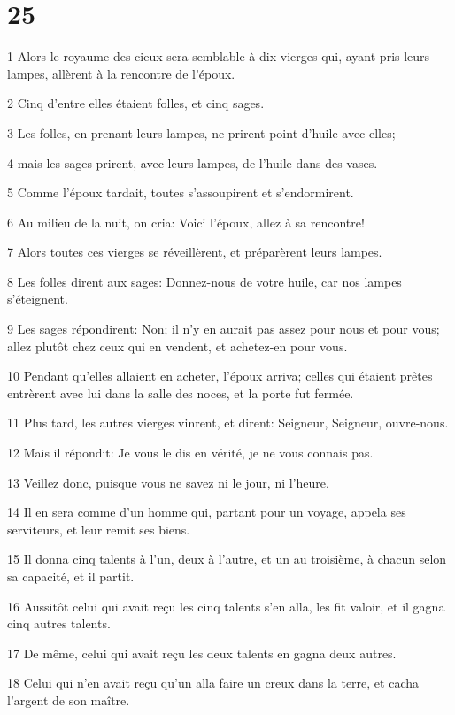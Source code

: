 \chapter{25}

\par 1 Alors le royaume des cieux sera semblable à dix vierges qui, ayant pris leurs lampes, allèrent à la rencontre de l'époux.
\par 2 Cinq d'entre elles étaient folles, et cinq sages.
\par 3 Les folles, en prenant leurs lampes, ne prirent point d'huile avec elles;
\par 4 mais les sages prirent, avec leurs lampes, de l'huile dans des vases.
\par 5 Comme l'époux tardait, toutes s'assoupirent et s'endormirent.
\par 6 Au milieu de la nuit, on cria: Voici l'époux, allez à sa rencontre!
\par 7 Alors toutes ces vierges se réveillèrent, et préparèrent leurs lampes.
\par 8 Les folles dirent aux sages: Donnez-nous de votre huile, car nos lampes s'éteignent.
\par 9 Les sages répondirent: Non; il n'y en aurait pas assez pour nous et pour vous; allez plutôt chez ceux qui en vendent, et achetez-en pour vous.
\par 10 Pendant qu'elles allaient en acheter, l'époux arriva; celles qui étaient prêtes entrèrent avec lui dans la salle des noces, et la porte fut fermée.
\par 11 Plus tard, les autres vierges vinrent, et dirent: Seigneur, Seigneur, ouvre-nous.
\par 12 Mais il répondit: Je vous le dis en vérité, je ne vous connais pas.
\par 13 Veillez donc, puisque vous ne savez ni le jour, ni l'heure.
\par 14 Il en sera comme d'un homme qui, partant pour un voyage, appela ses serviteurs, et leur remit ses biens.
\par 15 Il donna cinq talents à l'un, deux à l'autre, et un au troisième, à chacun selon sa capacité, et il partit.
\par 16 Aussitôt celui qui avait reçu les cinq talents s'en alla, les fit valoir, et il gagna cinq autres talents.
\par 17 De même, celui qui avait reçu les deux talents en gagna deux autres.
\par 18 Celui qui n'en avait reçu qu'un alla faire un creux dans la terre, et cacha l'argent de son maître.

